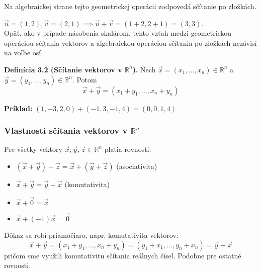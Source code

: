 \documentclass[11pt]{article}
\renewcommand{\vec}[1]{\overrightarrow{#1}}
\newcommand{\R}{\mathbb{R}}
\begin{document}
Na algebraickej strane tejto geometrickej operácii zodpovedá sčítanie po zložkách.
\begin{center}
\end{center}
$\vec{u}=(1,2), \vec{v}=(2,1) \implies \vec{u}+\vec{v}=(1+2, 2+1)=(3,3)$.\\
Opäť, ako v prípade násobenia skalárom, tento vzťah medzi geometrickou operáciou sčítania vektorov a algebraickou operáciou sčítania po zložkách nezávisí na voľbe osí.

\vspace{1em}
\noindent\textbf{Definícia 3.2 (Sčítanie vektorov v $\R^n$).}
Nech $\vec{x}=(x_1, \dots, x_n) \in \R^n$ a $\vec{y}=(y_1, \dots, y_n) \in \R^n$. Potom
$$ \vec{x}+\vec{y} = (x_1+y_1, \dots, x_n+y_n) $$

\noindent\textbf{Príklad:} $(1,-3,2,0) + (-1,3,-1,4) = (0,0,1,4)$

\subsubsection{Vlastnosti sčítania vektorov v $\R^n$}
Pre všetky vektory $\vec{x}, \vec{y}, \vec{z} \in \R^n$ platia rovnosti:
\begin{itemize}
    \item $(\vec{x}+\vec{y})+\vec{z} = \vec{x}+(\vec{y}+\vec{z})$ (asociativita)
    \item $\vec{x}+\vec{y} = \vec{y}+\vec{x}$ (komutativita)
    \item $\vec{x}+\vec{0} = \vec{x}$
    \item $\vec{x}+(-1)\vec{x} = \vec{0}$
\end{itemize}
Dôkaz sa robí priamočiaro, napr. komutativita vektorov:
$$ \vec{x}+\vec{y} = (x_1+y_1, \dots, x_n+y_n) = (y_1+x_1, \dots, y_n+x_n) = \vec{y}+\vec{x} $$
pričom sme využili komutativitu sčítania reálnych čísel. Podobne pre ostatné rovnosti.
\end{document}
